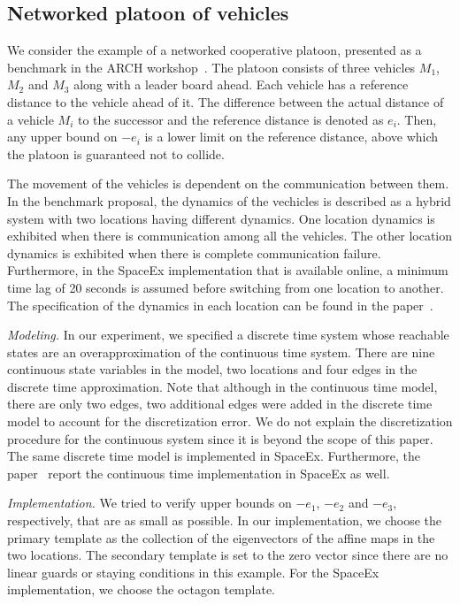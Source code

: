 \subsection{Networked platoon of vehicles}
We consider the example of a networked cooperative platoon, presented
as a benchmark in the ARCH workshop~\cite{TODO}.  The platoon consists
of three vehicles $M_1$, $M_2$ and $M_3$ along with a leader board
ahead.  Each vehicle has a reference distance to the vehicle ahead of
it.  The difference between the actual distance of a vehicle $M_i$ to
the successor and the reference distance is denoted as $e_i$.  Then,
any upper bound on $-e_i$ is a lower limit on the reference
distance, above which the platoon is guaranteed not to collide.

The movement of the vehicles is dependent on the communication between
them.  In the benchmark proposal, the dynamics of the vechicles is
described as a hybrid system with two locations having different
dynamics.  One location dynamics is exhibited when there is
communication among all the vehicles.  The other location dynamics is
exhibited when there is complete communication failure.  Furthermore,
in the SpaceEx implementation that is available online, a minimum time
lag of 20 seconds is assumed before switching from one location to
another.  The specification of the dynamics in each location can be
found in the paper~\cite{TODO}.

\emph{Modeling.}  In our experiment, we specified a discrete time
system whose reachable states are an overapproximation of the
continuous time system.  There are nine continuous state variables in
the model, two locations and four edges in the discrete time
approximation.  Note that although in the continuous time model, there
are only two edges, two additional edges were added in the discrete
time model to account for the discretization error.  We do not explain
the discretization procedure for the continuous system since it is
beyond the scope of this paper.  The same discrete time model is
implemented in SpaceEx.  Furthermore, the paper~\cite{TODO} report the
continuous time implementation in SpaceEx as well.

\emph{Implementation.}  We tried to verify upper
bounds on $-e_1$, $-e_2$ and $-e_3$, respectively, that are as small
as possible.  In our implementation, we choose the primary
template as the collection of the eigenvectors of the affine maps in
the two locations.  The secondary template is set to the zero vector
since there are no linear guards or staying conditions in this
example.  For the SpaceEx implementation, we choose the octagon
template.

